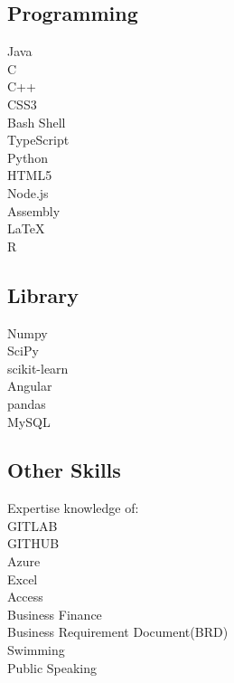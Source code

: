 \documentclass[]{deedy-resume-openfont}
\begin{document}
\begin{minipage}[t]{0.33\textwidth}
\subsection{Programming}
\textbullet{} Java \\ 
\textbullet{} C \\  
\textbullet{} C++ \\ 
\textbullet{} CSS3 \\ 
\textbullet{} Bash Shell \\ 
\textbullet{} TypeScript \\
\textbullet{} Python \\
\textbullet{} HTML5 \\ 
\textbullet{} Node.js \\ 
\textbullet{} Assembly \\
\textbullet{} \LaTeX\ \\
\textbullet{} R \\
\sectionsep
\subsection{Library}
\textbullet{} Numpy \\
\textbullet{} SciPy \\ 
\textbullet{} scikit-learn \\
\textbullet{} Angular \\
\textbullet{} pandas \\
\textbullet{} MySQL \\
\sectionsep
\subsection{Other Skills}
Expertise knowledge of: \\
\textbullet{} GITLAB\\ 
\textbullet{} GITHUB \\ 
\textbullet{} Azure \\ 
\textbullet{} Excel \\ 
\textbullet{} Access \\ 
\textbullet{} Business Finance \\ 
\textbullet{} Business Requirement Document(BRD)  \\
\textbullet{} Swimming \\
\textbullet{} Public Speaking
\sectionsep

%
%

\end{minipage} 
\end{document}
